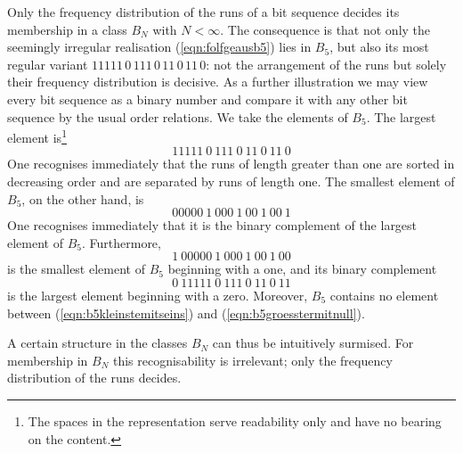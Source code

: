 \documentclass[11pt,a4paper]{scrartcl}
\theoremstyle{plain}
\theoremstyle{definition}
\theoremstyle{remark}
\begin{document}
Only the frequency distribution of the runs of a bit sequence decides
its membership in a class $B_N$ with $N<\infty$. The consequence is
that not only the seemingly irregular realisation
(\ref{eqn:folfgeausb5}) lies in $B_5$, but also its most regular
variant $11111\,0\,111\,0\,11\,0\,11\,0$: not the arrangement of the
runs but solely their frequency distribution is decisive. As a
further illustration we may view every bit sequence as a binary number
and compare it with any other bit sequence by the usual order
relations. We take the elements of $B_5$. The largest element
is\footnote{The spaces in the representation serve readability only
and have no bearing on the content.}
\begin{equation}
  11111\ 0\ 111\ 0\ 11\ 0\ 11\ 0
\end{equation}
One recognises immediately that the runs of length greater than one
are sorted in decreasing order and are separated by runs of length
one. The smallest element of $B_5$, on the other hand, is
\begin{equation}
  00000\ 1\ 000\ 1\ 00\ 1\ 00\ 1
\end{equation}
One recognises immediately that it is the binary complement of the
largest element of $B_5$. Furthermore,
\begin{equation}\label{eqn:b5kleinstemitseins}
  1\ 00000\ 1\ 000\ 1\ 00\ 1\ 00
\end{equation}
is the smallest element of $B_5$ beginning with a one, and its binary
complement
\begin{equation}\label{eqn:b5groesstermitnull}
  0\ 11111\ 0\ 111\ 0\ 11\ 0\ 11
\end{equation}
is the largest element beginning with a zero. Moreover, $B_5$
contains no element between (\ref{eqn:b5kleinstemitseins}) and
(\ref{eqn:b5groesstermitnull}).

\noindent A certain structure in the classes $B_N$ can thus be
intuitively surmised. For membership in $B_N$ this recognisability is
irrelevant; only the frequency distribution of the runs decides.
\end{document}
